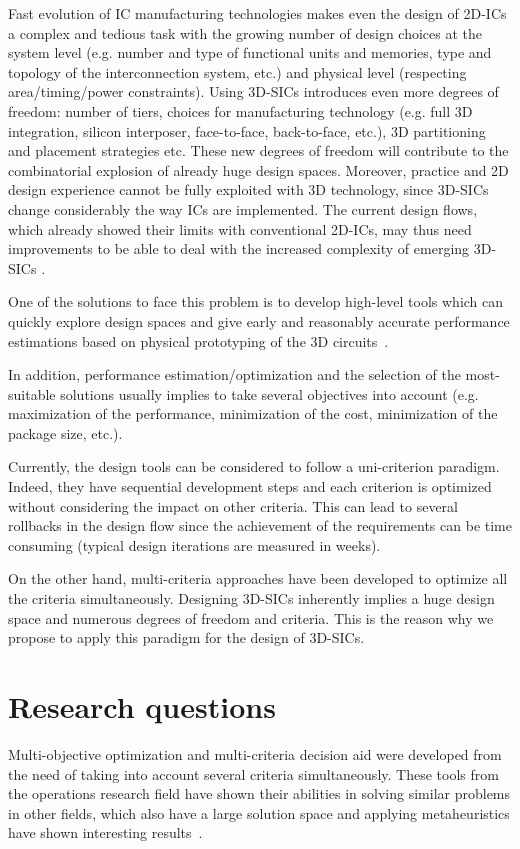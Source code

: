 Fast evolution of IC manufacturing technologies makes even the design of 2D-ICs a complex and tedious task with the growing number of design choices at the system level (e.g. number and type of functional units and memories, type and topology of the interconnection system, etc.) and physical level (respecting area/timing/power constraints). Using 3D-SICs introduces even more degrees of freedom: number of tiers, choices for manufacturing technology (e.g. full 3D integration, silicon interposer, face-to-face, back-to-face, etc.), 3D partitioning and placement strategies etc. These new degrees of freedom will contribute to the combinatorial explosion of already huge design spaces. Moreover, practice and 2D design experience cannot be fully exploited with 3D technology, since 3D-SICs change considerably the way ICs are implemented. The current design flows, which already showed their limits with conventional 2D-ICs, may thus need improvements to be able to deal with the increased complexity of emerging 3D-SICs \cite{vanderbiest06, PFF10}.

One of the solutions to face this problem is to develop high-level tools which can quickly explore design spaces and give early and reasonably accurate performance estimations based on physical prototyping of the 3D circuits~\cite{PFF10}.

In addition, performance estimation/optimization and the selection of the most-suitable solutions usually implies to take several objectives into account (e.g. maximization of the performance, minimization of the cost, minimization of the package size, etc.).

Currently, the design tools can be considered to follow a uni-criterion paradigm. Indeed, they have sequential development steps and each criterion is optimized without considering the impact on other criteria. This can lead to several rollbacks in the design flow since the achievement of the requirements can be time consuming (typical design iterations are measured in weeks).

On the other hand, multi-criteria approaches have been developed to optimize all the criteria simultaneously. Designing 3D-SICs inherently implies a huge design space and numerous degrees of freedom and criteria. This is the reason why we propose to apply this paradigm for the design of 3D-SICs.

\section*{Research questions}
Multi-objective optimization and multi-criteria decision aid were developed from the need of taking into account several criteria simultaneously. These tools from the operations research field have shown their abilities in solving similar problems in other fields, which also have a large solution space and applying metaheuristics have shown interesting results~\cite{talbi09}.


